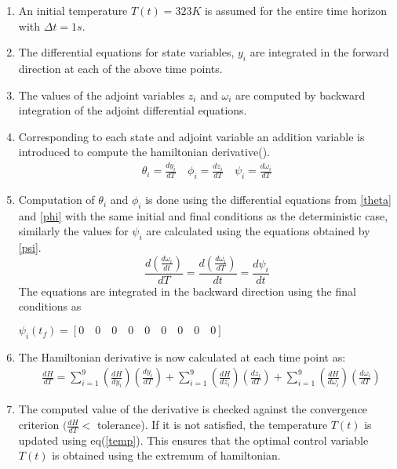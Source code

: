 \documentclass[3p,times,authoryear]{elsarticle}
\begin{document}
\begin{enumerate}
\item An initial temperature $T(t) = 323 K$ is assumed for the entire time horizon with $\Delta t = 1s$.
\item The differential equations for state variables, $y_{i}$ are integrated in the forward direction at each of the above time points.
\item The values of the adjoint variables $z_{i}$ and $\omega_{i}$ are computed by backward integration of the adjoint differential equations. 
\item Corresponding to each state and adjoint variable an addition variable is introduced to compute the hamiltonian derivative(\cite{benavides}).
\begin{align}
\theta_{i} = \frac{dy_{i}}{dT} \quad \phi_{i} = \frac{dz_{i}}{dT} \quad \psi_{i} = \frac{d\omega_{i}}{dT} \label{thetafipsi} 
\end{align}
\item Computation of $\theta_{i}$ and $\phi_{i}$ is done using the differential equations from \ref{theta} and \ref{phi} with the same initial and final conditions as the deterministic case, similarly the values for $\psi_{i}$ are calculated using the equations obtained by \ref{psi}.
\begin{equation}
\frac{d\left( \frac{d\omega_{i}}{dt}  \right)}{dT} = \frac{d\left( \frac{d\omega_{i}}{dT}  \right)}{dt} = \frac{d\psi_{i}}{dt} \label{psi} 
\end{equation}
The equations are integrated in the backward direction using the final conditions as 
\begin{center}
 $\psi_{i}(t_{f}) = \left[  0 \quad 0 \quad 0 \quad 0 \quad 0 \quad 0 \quad 0 \quad 0 \quad 0 \right]$ 
\end{center} 
\item The Hamiltonian derivative is now calculated at each time point as:
\begin{align}
&\frac{dH}{dT} = \sum_{i=1}^{9} \left( \frac{dH}{dy_{i}}\right)\left(	\frac{dy_{i}}{dT} \right) + \sum_{i=1}^{9} \left(\frac{dH}{dz_{i}}\right)\left(\frac{dz_{i}}{dT} \right) + \sum_{i=1}^{9} \left(\frac{dH}{d\omega_{i}}\right)\left(\frac{d\omega_{i}}{dT} \right)
\end{align}
\item The computed value of the derivative is checked against the convergence criterion $(\frac{dH}{dT}<$ tolerance). If it is not satisfied, the temperature $T(t)$ is updated using eq(\ref{temp}). This ensures that the optimal control variable $T(t)$ is obtained using the extremum of hamiltonian. 

\end{enumerate}
\end{document}
